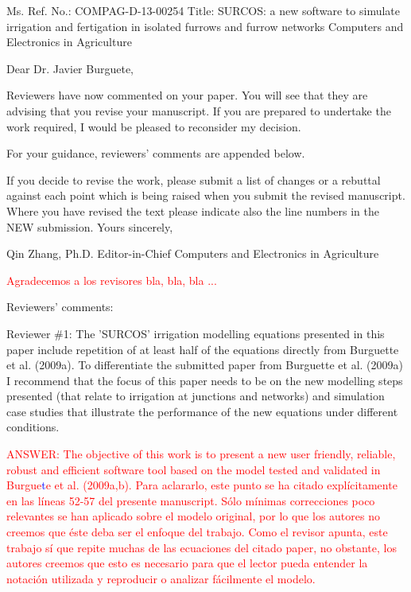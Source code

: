 \documentclass[a4paper]{article}
\begin{document}
Ms. Ref. No.: COMPAG-D-13-00254
Title: SURCOS: a new software to simulate irrigation and fertigation in isolated furrows and furrow networks
Computers and Electronics in Agriculture

Dear Dr. Javier Burguete,

Reviewers have now commented on your paper. You will see that they are advising that you revise your manuscript. If you are prepared to undertake the work required, I would be pleased to reconsider my decision.

For your guidance, reviewers' comments are appended below.

If you decide to revise the work, please submit a list of changes or a rebuttal against each point which is being raised when you submit the revised manuscript. Where you have revised the text please indicate also the line numbers in the NEW submission.
%
%
Yours sincerely,

Qin Zhang, Ph.D.
Editor-in-Chief
Computers and Electronics in Agriculture

\textcolor{red}{Agradecemos a los revisores bla, bla, bla ...}

Reviewers' comments:


Reviewer \#1: The 'SURCOS' irrigation modelling equations presented in this paper include repetition of at least half of the equations directly from Burguette et al. (2009a). To differentiate the submitted paper from Burguette et al. (2009a) I recommend that the focus of this paper needs to be on the new modelling steps presented (that relate to irrigation at junctions and networks) and simulation case studies that illustrate the performance of the new equations under different conditions.

\textcolor{red}{ANSWER: The objective of this work is to present a new user 
friendly, reliable, robust and efficient software tool based on the model
tested and validated in Burgue}\textcolor{blue}{t}\textcolor{red}{e et al.
(2009a,b). Para aclararlo, este punto se ha citado explícitamente en las líneas
52-57 del presente manuscript. Sólo mínimas correcciones poco relevantes se han 
aplicado sobre el modelo original, por lo que los autores no creemos que éste
deba ser el enfoque del trabajo. Como el revisor apunta, este trabajo sí que
repite muchas de las ecuaciones del citado paper, no obstante, los autores
creemos que esto es necesario para que el lector pueda entender la notación
utilizada y reproducir o analizar fácilmente el modelo.}
\end{document}
